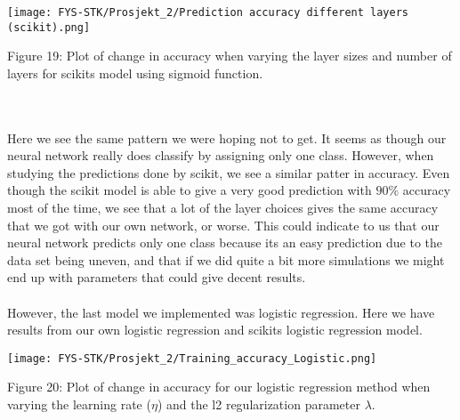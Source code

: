 \documentclass[english,notitlepage,reprint,nofootinbib]{revtex4-1}  %
\begin{document}
\texttt{[image: FYS-STK/Prosjekt\_2/Prediction accuracy different layers (scikit).png]}
\caption{Figure 19: Plot of change in accuracy when varying the layer sizes and number of layers for scikits model using sigmoid function.}
\\
\\
Here we see the same pattern we were hoping not to get. It seems as though our neural network really does classify by assigning only one class. However, when studying the predictions done by scikit, we see a similar patter in accuracy. Even though the scikit model is able to give a very good prediction with $90 \%$ accuracy most of the time, we see that a lot of the layer choices gives the same accuracy that we got with our own network, or worse. This could indicate to us that our neural network predicts only one class because its an easy prediction due to the data set being uneven, and that if we did quite a bit more simulations we might end up with parameters that could give decent results.
\\
\\
However, the last model we implemented was logistic regression. Here we have results from our own logistic regression and scikits logistic regression model.

\texttt{[image: FYS-STK/Prosjekt\_2/Training\_accuracy\_Logistic.png]}
\caption{Figure 20: Plot of change in accuracy for our logistic regression method when varying the learning rate ($\eta$) and the l2 regularization parameter $\lambda$.}
\end{document}
